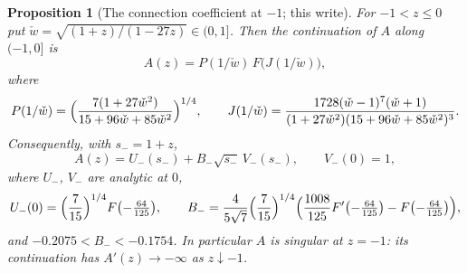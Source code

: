 \documentclass[11pt,letterpaper]{article}
\newtheorem{proposition}[theorem]{Proposition}
\theoremstyle{remark}\newtheorem{remark}[theorem]{Remark}
\newcounter{l7gtrsavedeq}
\begin{document}
\begin{proposition}[The connection coefficient at $-1$; this write]\label{l7g:hp:prop:minusone}
For $-1<z\le0$ put $\check w=\sqrt{(1+z)/(1-27z)}\in(0,1]$. Then the continuation
of $A$ along $(-1,0]$ is
\begin{equation}\label{l7g:hp:eq:minusoneGF}
 A(z)=P(1/\check w)\,F\bigl(J(1/\check w)\bigr),
\end{equation}
where
\[
 P(1/\check w)=\Bigl(\frac{7(1+27\check w^2)}{15+96\check w+85\check w^2}\Bigr)^{1/4},\qquad
 J(1/\check w)=\frac{1728(\check w-1)^7(\check w+1)}{(1+27\check w^2)(15+96\check w+85\check w^2)^3}.
\]
Consequently, with $s_-=1+z$,
\begin{equation}\label{l7g:hp:eq:minusone}
 A(z)=U_-(s_-)+B_-\sqrt{s_-}\,V_-(s_-),\qquad V_-(0)=1,
\end{equation}
where $U_-$, $V_-$ are analytic at $0$,
\begin{equation}\label{l7g:hp:eq:Bminus}
 U_-(0)=\Bigl(\frac7{15}\Bigr)^{1/4}F\bigl(-\tfrac{64}{125}\bigr),\qquad
 B_-=\frac{4}{5\sqrt7}\Bigl(\frac7{15}\Bigr)^{1/4}
 \Bigl(\frac{1008}{125}F'\bigl(-\tfrac{64}{125}\bigr)-F\bigl(-\tfrac{64}{125}\bigr)\Bigr),
\end{equation}
and $-0.2075<B_-<-0.1754$. In particular $A$ is singular at $z=-1$: its
continuation has $A'(z)\to-\infty$ as $z\downarrow-1$.
\end{proposition}
\end{document}

